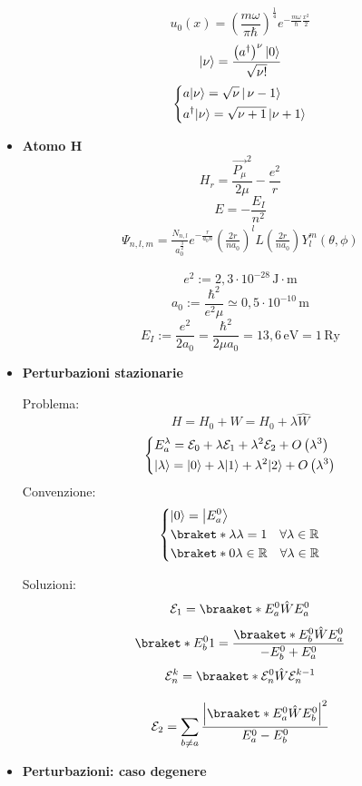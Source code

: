 \documentclass{article}
\DeclarePairedDelimiter\ket{\lvert}{\rangle}
\begin{document}
\begin{footnotesize}
\begin{multicols*}{3}
\begin{itemize}[leftmargin=*]
		\[u_0(x) = \left( \frac{m\omega }{\pi \hbar }\right)^{\frac{1}{4}} e^{-\frac{m\omega }{\hbar }\frac{x^2}{2}}\]
		\[\ket*{\nu } = \frac{\left(a^\dag\right)^\nu \ket*{0}}{\sqrt{\nu !}}\]
		\[
			\left\{\begin{aligned}
				&a\ket*{\nu } = \sqrt{\nu}\,\ket*{\,\mathrm{\nu -1}} \\
				& a^\dag\ket*{\nu } = \sqrt{\nu +1}\,\ket*{\nu +1}\\
			\end{aligned}\right.
		\]
	\item \textbf{Atomo H}
		\[H_r = \frac{\vec{P_\mu }^2}{2\mu } - \frac{e^2}{r}\]
		\[E=-\frac{E_I}{n^2}\]
		\begin{align*}\Psi _{n,l,m} = \frac{N_{n,l}}{a_0^{\frac{3}{2}}} e^{-\frac{r}{a_0n}} \left(\frac{2r}{na_0}\right)^l   L\left(\frac{2r}{na_0}\right) Y_l^m(\theta ,\phi )\end{align*}


		\[e^2 := 2,3\cdot 10^{-28}\,\mathrm{J\cdot m}\]
		\[a_0 := \frac{\hbar ^2}{e^2\mu } \simeq 0,5\cdot 10^{-10}\,\mathrm{m}\]
		\[E_I := \frac{e^2}{2a_0} = \frac{\hbar ^2}{2\mu a_0} = 13,6\,\mathrm{eV} = 1\,\mathrm{Ry}\]
	\item \textbf{Perturbazioni stazionarie}

		Problema:
		\[H= H_0+W = H_0+\lambda \hat{W}\]
		\[
			\left\{\begin{aligned}
				&E_a^\lambda = \mathcal{E}_0 + \lambda \mathcal{E}_1 + \lambda ^2\mathcal{E}_2 + O\left(\lambda ^3\right)\\
				&\ket*{\lambda } = \ket*{0} + \lambda \ket*{1} + \lambda ^2\ket*{2} + O\left(\lambda ^3\right)\\
			\end{aligned}\right.
		\]
		Convenzione:
		\[
			\left\{\begin{aligned}
				&\ket*{0}=\ket*{E_a^0}\\
				&\braket*{\lambda }{\lambda } = 1 \ \ \ \forall \lambda\in \mathbb{R} \\
				&\braket*{0}{\lambda }\in \mathbb{R}\ \ \ \forall \lambda \in \mathbb{R}
			\end{aligned}\right.
		\]

		Soluzioni:
		\[\mathcal{E}_1 = \braaket*{E_a^0}{\hat{W}}{E_a^0}\]
		\[\braket*{E_b^0}{1} = \frac{\braaket*{E_b^0}{\hat{W}}{E_a^0}}{-E_b^0 + E_a^0}\]
		\[\mathcal{E}_n^k = \braaket*{\mathcal{E}_n^0}{\hat{W}}{\mathcal{E}_n^{k-1}}\]

		\[\mathcal{E}_2 = \sum_{b\neq a} \frac{\left|\braaket*{E_a^0}{\hat{W}}{E_b^0}\right|^2}{E_a^0 - E_b^0}\]
	\item \textbf{Perturbazioni: caso degenere}


\end{itemize}
\end{multicols*}
\end{footnotesize}
\end{document}
